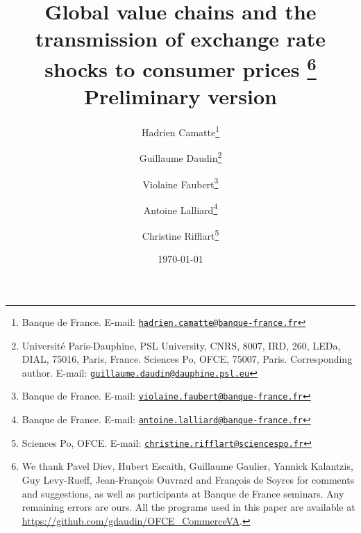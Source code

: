 \documentclass[11pt,a4paper]{article}
\newcommand{\email}[1]{\href{mailto:#1}{\nolinkurl{#1}}}
\begin{document}
\title{Global value chains and the transmission of exchange rate shocks to consumer prices	\thanks{We thank Pavel Diev, Hubert Escaith, Guillaume Gaulier, Yannick Kalantzis, Guy Levy-Rueff, Jean-François Ouvrard and François de Soyres for comments and suggestions, as well as participants at Banque de France seminars. Any remaining errors are ours. All the programs used in this paper are available at \url{https://github.com/gdaudin/OFCE_CommerceVA}.}\\
\vspace{1cm}
\normalsize{Preliminary version}
}
\vspace{1cm}
\date{\today}
\author{
	Hadrien Camatte\thanks{Banque de France. E-mail: \email{hadrien.camatte@banque-france.fr}}
	\and
	Guillaume Daudin\thanks{Université Paris-Dauphine, PSL University, CNRS, 8007, IRD, 260, LEDa, DIAL, 75016, Paris, France. Sciences Po, OFCE, 75007, Paris. Corresponding author. E-mail: \email{guillaume.daudin@dauphine.psl.eu}}
	\and
	Violaine Faubert\thanks{Banque de France. E-mail: \email{violaine.faubert@banque-france.fr}}
	\and
	Antoine Lalliard\thanks{Banque de France. E-mail: \email{antoine.lalliard@banque-france.fr}}
	\and
	Christine Rifflart\thanks{Sciences Po, OFCE. E-mail: \email{christine.rifflart@sciencespo.fr}}
}
\maketitle
\end{document}
